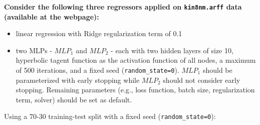 \documentclass[12pt]{article}
\begin{document}
{\color{questioncolor}\bfseries
\noindent
Consider the following three regressors applied on \texttt{kin8nm.arff} data
(available at the webpage):
\begin{itemize}
    \item linear regression with Ridge regularization term of 0.1
    \item two MLPs - $MLP_1$ and $MLP_2$ - each with two hidden layers of
          size 10, hyperbolic tagent function as the activation function of all nodes,
          a maximum of 500 iterations, and a fixed seed (\texttt{random\_state=0}).
          $MLP_1$ should be parameterized with early stopping while $MLP_2$ should not
          consider early stopping.
          Remaining parameters (e.g., loss function, batch size, regularization term,
          solver) should be set as default.
\end{itemize}
Using a 70-30 training-test split with a fixed seed (\texttt{random\_state=0}):
}
\end{document}
